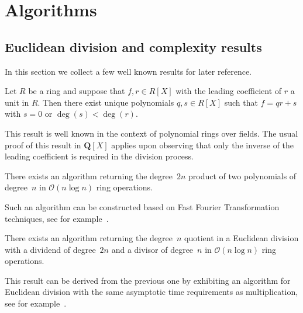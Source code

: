 
\chapter{Algorithms}


\section{Euclidean division and complexity results}
\label{sec:EuclideanDivision}

In this section we collect a few well known results for later 
reference.

\begin{prop}
Let $R$ be a ring and suppose that $f, r \in R[X]$ with the 
leading coefficient of $r$ a unit in $R$.  Then there exist 
unique polynomials $q, s \in R[X]$ such that $f = q r + s$ 
with $s = 0$ or $\deg(s) < \deg(r)$.
\end{prop}

This result is well known in the context of polynomial rings 
over fields.  The usual proof of this result in $\mathbf{Q}[X]$ 
applies upon observing that only the inverse of the leading 
coefficient is required in the division process.

\begin{prop} \label{prop:mul}
There exists an algorithm returning the degree~$2n$ product 
of two polynomials of degree~$n$ in $\mathcal{O}(n \log n)$ 
ring operations.
\end{prop}

Such an algorithm can be constructed based on Fast Fourier Transformation 
techniques, see for example~\citep[\S 8]{GathenGerhard2003}.

\begin{prop} \label{prop:div1}
There exists an algorithm returning the degree~$n$ quotient 
in a Euclidean division with a dividend of degree~$2n$ 
and a divisor of degree~$n$ in $\mathcal{O}(n \log n)$ 
ring operations.
\end{prop}

This result can be derived from the previous one by exhibiting an algorithm 
for Euclidean division with the same asymptotic time requirements as 
multiplication, see for example~\citep[\S 11]{GathenGerhard2003}.

